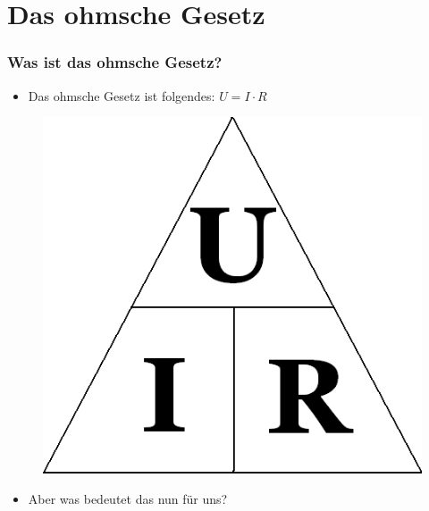 


\subtitle{Technik Klasse E 03 \\
          Ohmsches Gesetz, Leistung \& Arbeit \\[2em]}
\date{Stand 27.10.2015}



\section{Das ohmsche Gesetz}

\begin{frame}
  \frametitle{Was ist das ohmsche Gesetz?}
  \begin{itemize}
    \item Das ohmsche Gesetz ist folgendes: $U = I \cdot R$
  \end{itemize}
  \begin{center}
    \begin{figure}
      \includegraphics[width=\textwidth,height=.7\textheight,keepaspectratio]{e03/Ohm_law_triangle.png}
    \end{figure}
 	\end{center}
 	\begin{itemize}
 		\item	Aber was bedeutet das nun für uns?
 	\end{itemize}
\end{frame}

